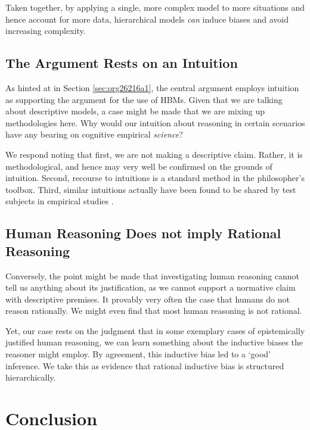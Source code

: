 \documentclass[11pt, a4paper]{article}
\begin{document}
Taken together, by applying a single, more complex model to more situations and
hence account for more data, hierarchical models \emph{can} induce biases and
avoid increasing complexity.

\subsection{The Argument Rests on an Intuition}
\label{sec:orgee04e3e}

As hinted at in Section \ref{sec:org26216a1}, the central argument employs
intuition as supporting the argument for the use of HBMs. Given that we are talking
about descriptive models, a case might be made that we are mixing up
methodologies here. Why would our intuition about reasoning in certain scenarios
have any bearing on cognitive empirical \textit{science}?

We respond noting that first, we are not making a descriptive claim. Rather, it
is methodological, and hence may very well be confirmed on the grounds of
intuition. Second,  recourse to intuitions is a standard method in the
philosopher's toolbox. Third, similar
intuitions actually have been found to be shared by test subjects
in empirical studies 
\citep{nisbett83_use_statis_heuris_every_induc_reason}.

\subsection{Human Reasoning Does not imply Rational Reasoning}
\label{sec:org7bba5c8}

Conversely, the point might be made that investigating human reasoning cannot
tell us anything about its justification, as we cannot support a normative claim
with descriptive premises. It provably very often the case that humans do not reason rationally. We might even
find that most human reasoning is not rational.

Yet, our case rests on the judgment
that in some exemplary cases of epistemically justified human reasoning, we can
learn something about the inductive biases the reasoner might employ. By
agreement, this inductive bias led to a `good' inference. We take this as
evidence that rational inductive bias is structured
hierarchically. 

\section{Conclusion}
\label{sec:orgceda257}
\end{document}
